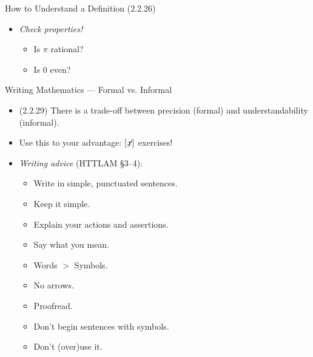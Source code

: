 \documentclass[../slides.tex]{subfiles}
\begin{document}
\begin{frame}{How to Understand a Definition (2.2.26)}
\begin{itemize}
\begin{itemize}
			\begin{itemize}
			
				\item Can we define primes in another way?
				
				\item  Is there another definition of $\pi$?			
			\end{itemize}
			
			\item \emph{Check properties!}
			
			\begin{itemize}
			
				\item Is $\pi$ rational?
				
				\item  Is $0$ even?	
						
			\end{itemize}
		
		\end{itemize}
		
\end{itemize}

\end{frame}

\begin{frame}{Writing Mathematics --- Formal vs. Informal}

	\begin{itemize}
	
		\item (2.2.29) There is a trade-off between precision (formal) and understandability (informal).
		
		\item Use this to your advantage: $[\not\hspace{-.5ex}x]$ exercises!
		
		\item \emph{Writing advice} (HTTLAM \S3--4):
		
		\begin{itemize}
		
			\item Write in simple, punctuated sentences.
			\item Keep it simple.
			\item Explain your actions and assertions.
			\item Say what you mean.
			\item Words $>$ Symbols.
			\item No arrows.
			\item Proofread.
			\item Don't begin sentences with symbols.
			\item Don't (over)use it.
			
		\end{itemize}

	
	\end{itemize}

\end{frame}
\end{document}
